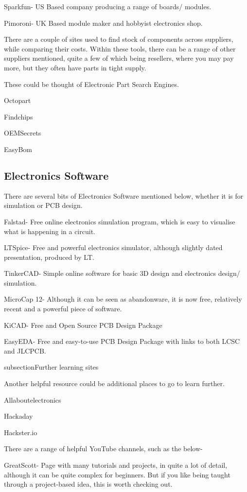 \documentclass[a4paper,11pt]{report}
\begin{document}
Sparkfun- US Based company producing a range of boards/ modules.

Pimoroni- UK Based module maker and hobbyist electronics shop.


There are a couple of sites used to find stock of components across suppliers, while comparing their costs. Within these tools, there can be a range of other suppliers mentioned, quite a few of which being resellers, where you may pay more, but they often have parts in tight supply.

These could be thought of Electronic Part Search Engines.

Octopart

Findchips

OEMSecrets

EasyBom


\subsection{Electronics Software}

There are several bits of Electronics Software mentioned below, whether it is for simulation or PCB design.

Falstad- Free online electronics simulation program, which is easy to visualise what is happening in a circuit.

LTSpice- Free and powerful electronics simulator, although slightly dated presentation, produced by LT.

TinkerCAD- Simple online software for basic 3D design and electronics design/ simulation.

MicroCap 12- Although it can be seen as abandonware, it is now free, relatively recent and a powerful piece of software.

KiCAD- Free and Open Source PCB Design Package

EasyEDA- Free and easy-to-use PCB Design Package with links to both LCSC and JLCPCB.

subsection{Further learning sites}

Another helpful resource could be additional places to go to learn further.

Allaboutelectronics

Hackaday

Hackster.io

There are a range of helpful YouTube channels, such as the below-

GreatScott- Page with many tutorials and projects, in quite a lot of detail, although it can be quite complex for beginners. But if you like being taught through a project-based idea, this is worth checking out.
\end{document}
